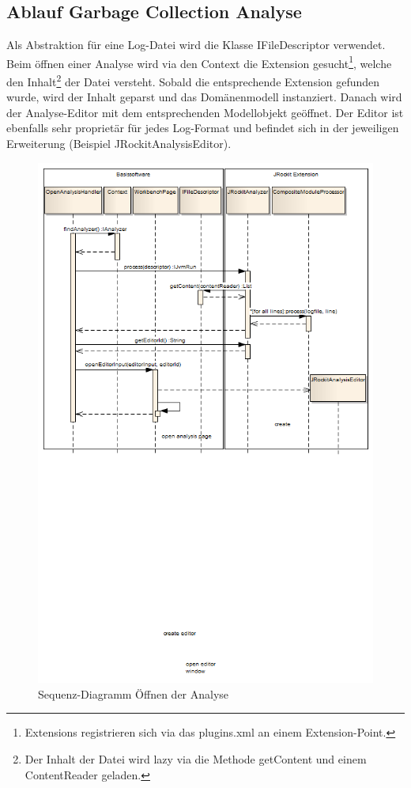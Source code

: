 \subsection{Ablauf Garbage Collection Analyse}
Als Abstraktion für eine Log-Datei wird die Klasse IFileDescriptor verwendet. Beim öffnen einer Analyse wird via den Context die Extension gesucht\footnote{Extensions registrieren sich via das plugins.xml an einem Extension-Point. }, welche den Inhalt\footnote{Der Inhalt der Datei wird lazy via die Methode getContent und einem ContentReader geladen.} der Datei versteht. Sobald die entsprechende Extension gefunden wurde, wird der Inhalt geparst und das Domänenmodell instanziert.
Danach wird der Analyse-Editor mit dem entsprechenden Modellobjekt geöffnet. Der Editor ist ebenfalls sehr proprietär für jedes Log-Format und befindet sich in der jeweiligen Erweiterung (Beispiel JRockitAnalysisEditor). 
 \begin{figure}[H]
  	\centering
    	\includegraphics[width=16.5cm]{images/core_sequence_analysis}
	\caption{Sequenz-Diagramm Öffnen der Analyse}
\end{figure}
